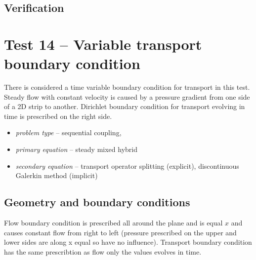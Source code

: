 \subsection*{Verification}


\section{Test 14 -- Variable transport boundary condition}
There is considered a time variable boundary condition for transport in this test. Steady flow with constant velocity is caused by a pressure gradient from one side of a 2D strip to another. Dirichlet boundary condition for transport evolving in time is prescribed on the right side. 

\begin{itemize} 
    \item \emph{problem type} -- sequential coupling, 
    \item \emph{primary equation} -- steady mixed hybrid
    \item \emph{secondary equation} -- transport operator splitting (explicit), discontinuous Galerkin method (implicit)
  \end{itemize}

\subsection*{Geometry and boundary conditions}

Flow boundary condition is prescribed all around the plane and is equal $x$ and causes constant flow from right to left (pressure prescribed on the upper and lower sides are along x equal so have no influence). Transport boundary condition has the same prescribtion as flow only the values evolves in time.


